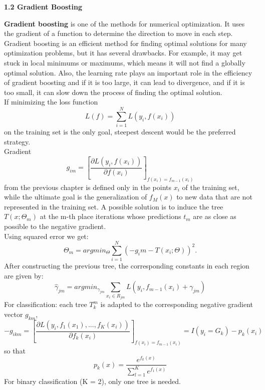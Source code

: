 \documentclass[12pt, letterpaper, twoside]{article}
\begin{document}
\begin{center}
\textbf{\large{1.2 Gradient Boosting}}
\end{center}
\hspace*{4ex} \textbf{Gradient boosting} is one of the methods for numerical optimization. It uses the gradient of a function to determine the direction to move in each step.\\ 
\hspace*{4ex}Gradient boosting is an efficient method for finding optimal solutions for many optimization problems, but it has several drawbacks. For example, it may get stuck in local minimums or maximums, which means it will not find a globally optimal solution. Also, the learning rate plays an important role in the efficiency of gradient boosting and if it is too large, it can lead to divergence, and if it is too small, it can slow down the process of finding the optimal solution.\\
\hspace*{4ex}If minimizing the loss function
\begin{equation*}
L(f)=\sum_{i=1}^N L(y_i,f(x_i))
\end{equation*}
on the training set is the only goal, steepest descent would be the preferred strategy.\\
\hspace*{4ex}Gradient
\begin{equation*}
g_{im}=[\frac{\partial L(y_i,f(x_i))}{\partial f(x_i)}]_ {f(x_i)=f_{m-1}(x_i)}
\end{equation*}
from the previous chapter is defined only in the points $x_i$ of the training set, while the ultimate goal is the generalization of $f_M(x)$ to new data that are not represented in the training set. A possible solution is to induce the tree $T(x;\Theta_m)$ at the m-th place
iterations whose predictions $t_m$ are as close as possible to the negative gradient.\\
\hspace*{4ex} Using squared error we get:
\begin{equation*}
\Theta_m=argmin_{\Theta}\sum_{i=1}^N (-g_i m-T(x_i;\Theta))^2.
\end{equation*}
After constructing the previous tree, the corresponding constants in each region are given by:
\begin{equation*}
\hat{\gamma}_{jm}=argmin_{\gamma_{jm}}\sum_{x_i \in R_{jm}}L(y_i,f_{m-1}(x_i)+\gamma_{jm})
\end{equation*}
For classification: each tree $T_k^m$ is adapted to the corresponding negative gradient vector $g_{km}$,
\begin{equation*}
-g_{ikm}=[\frac{\partial L(y_i,f_1(x_1),...,f_K(x_i))}{\partial f_k(x_i)}]_{f(x_i)=f_{m-1}(x_i)}=I(y_i=G_k)-p_k(x_i)
\end{equation*}
so that
\begin{equation*}
p_k(x)=\frac{e^{f_k(x)}}{\sum_{l=1}^K e^{f_1 (x)}}
\end{equation*}
For binary classification (K = 2), only one tree is needed.
\end{document}
